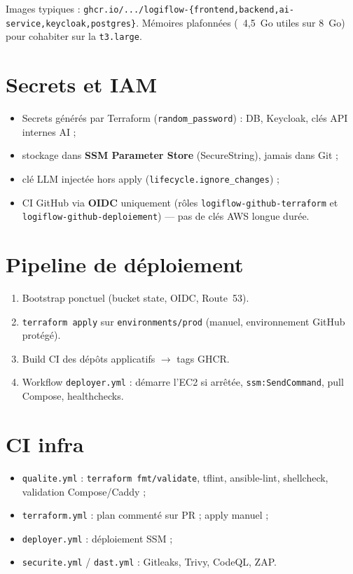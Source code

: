 Images typiques : \texttt{ghcr.io/.../logiflow-\{frontend,backend,ai-service,keycloak,postgres\}}.
Mémoires plafonnées (~4,5~Go utiles sur 8~Go) pour cohabiter sur la \texttt{t3.large}.

\section{Secrets et IAM}

\begin{itemize}[leftmargin=*]
  \item Secrets générés par Terraform (\texttt{random\_password}) : DB, Keycloak, clés API internes AI ;
  \item stockage dans \textbf{SSM Parameter Store} (SecureString), jamais dans Git ;
  \item clé LLM injectée hors apply (\texttt{lifecycle.ignore\_changes}) ;
  \item CI GitHub via \textbf{OIDC} uniquement (rôles \texttt{logiflow-github-terraform} et
        \texttt{logiflow-github-deploiement}) --- pas de clés AWS longue durée.
\end{itemize}

\section{Pipeline de déploiement}


\begin{enumerate}[leftmargin=*]
  \item Bootstrap ponctuel (bucket state, OIDC, Route~53).
  \item \texttt{terraform apply} sur \texttt{environments/prod} (manuel, environnement GitHub protégé).
  \item Build CI des dépôts applicatifs $\rightarrow$ tags GHCR.
  \item Workflow \texttt{deployer.yml} : démarre l'EC2 si arrêtée, \texttt{ssm:SendCommand},
        pull Compose, healthchecks.
\end{enumerate}

\section{CI infra}

\begin{itemize}[leftmargin=*]
  \item \texttt{qualite.yml} : \texttt{terraform fmt/validate}, tflint, ansible-lint, shellcheck, validation Compose/Caddy ;
  \item \texttt{terraform.yml} : plan commenté sur PR ; apply manuel ;
  \item \texttt{deployer.yml} : déploiement SSM ;
  \item \texttt{securite.yml} / \texttt{dast.yml} : Gitleaks, Trivy, CodeQL, ZAP.
\end{itemize}

